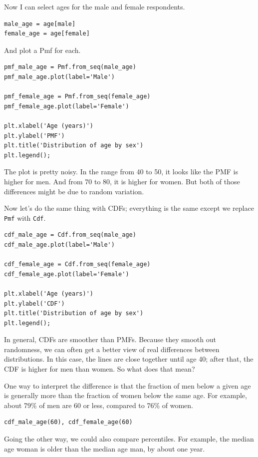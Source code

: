Now I can select ages for the male and female respondents.

\begin{lstlisting}[]
male_age = age[male]
female_age = age[female]
\end{lstlisting}

And plot a Pmf for each.

\begin{lstlisting}[]
pmf_male_age = Pmf.from_seq(male_age)
pmf_male_age.plot(label='Male')

pmf_female_age = Pmf.from_seq(female_age)
pmf_female_age.plot(label='Female')

plt.xlabel('Age (years)') 
plt.ylabel('PMF')
plt.title('Distribution of age by sex')
plt.legend();
\end{lstlisting}

The plot is pretty noisy. In the range from 40 to 50, it looks like the
PMF is higher for men. And from 70 to 80, it is higher for women. But
both of those differences might be due to random variation.

Now let's do the same thing with CDFs; everything is the same except we
replace \passthrough{\lstinline!Pmf!} with
\passthrough{\lstinline!Cdf!}.

\begin{lstlisting}[]
cdf_male_age = Cdf.from_seq(male_age)
cdf_male_age.plot(label='Male')

cdf_female_age = Cdf.from_seq(female_age)
cdf_female_age.plot(label='Female')

plt.xlabel('Age (years)') 
plt.ylabel('CDF')
plt.title('Distribution of age by sex')
plt.legend();
\end{lstlisting}

In general, CDFs are smoother than PMFs. Because they smooth out
randomness, we can often get a better view of real differences between
distributions. In this case, the lines are close together until age 40;
after that, the CDF is higher for men than women. So what does that
mean?

One way to interpret the difference is that the fraction of men below a
given age is generally more than the fraction of women below the same
age. For example, about 79\% of men are 60 or less, compared to 76\% of
women.

\begin{lstlisting}[]
cdf_male_age(60), cdf_female_age(60)
\end{lstlisting}

Going the other way, we could also compare percentiles. For example, the
median age woman is older than the median age man, by about one year.

